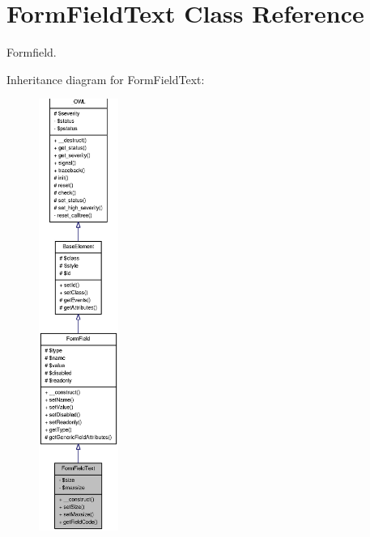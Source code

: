 \section{FormFieldText Class Reference}
\label{classFormFieldText}


Formfield.  




Inheritance diagram for FormFieldText:\nopagebreak
\begin{figure}[H]
\begin{center}
\leavevmode
\includegraphics[height=400pt]{classFormFieldText__inherit__graph}
\end{center}
\end{figure}


